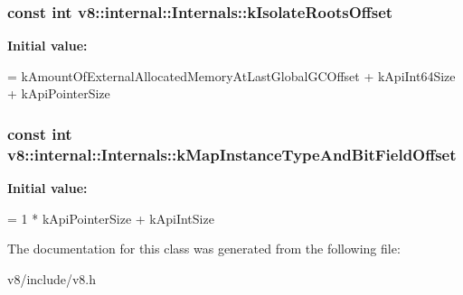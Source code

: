 \subsubsection[{\texorpdfstring{k\+Isolate\+Roots\+Offset}{kIsolateRootsOffset}}]{\setlength{\rightskip}{0pt plus 5cm}const int v8\+::internal\+::\+Internals\+::k\+Isolate\+Roots\+Offset\hspace{0.3cm}{\ttfamily [static]}}\hypertarget{classv8_1_1internal_1_1Internals_a3142f942a25203ce7fca0e9a4563c74d}{}\label{classv8_1_1internal_1_1Internals_a3142f942a25203ce7fca0e9a4563c74d}
{\bfseries Initial value\+:}
\begin{DoxyCode}
=
      kAmountOfExternalAllocatedMemoryAtLastGlobalGCOffset + kApiInt64Size +
      kApiPointerSize
\end{DoxyCode}
\subsubsection[{\texorpdfstring{k\+Map\+Instance\+Type\+And\+Bit\+Field\+Offset}{kMapInstanceTypeAndBitFieldOffset}}]{\setlength{\rightskip}{0pt plus 5cm}const int v8\+::internal\+::\+Internals\+::k\+Map\+Instance\+Type\+And\+Bit\+Field\+Offset\hspace{0.3cm}{\ttfamily [static]}}\hypertarget{classv8_1_1internal_1_1Internals_aeda3ec9bc2906bf6162b9cf3df9fd94a}{}\label{classv8_1_1internal_1_1Internals_aeda3ec9bc2906bf6162b9cf3df9fd94a}
{\bfseries Initial value\+:}
\begin{DoxyCode}
=
      1 * kApiPointerSize + kApiIntSize
\end{DoxyCode}


The documentation for this class was generated from the following file\+:\begin{DoxyCompactItemize}
\item 
v8/include/v8.\+h\end{DoxyCompactItemize}

